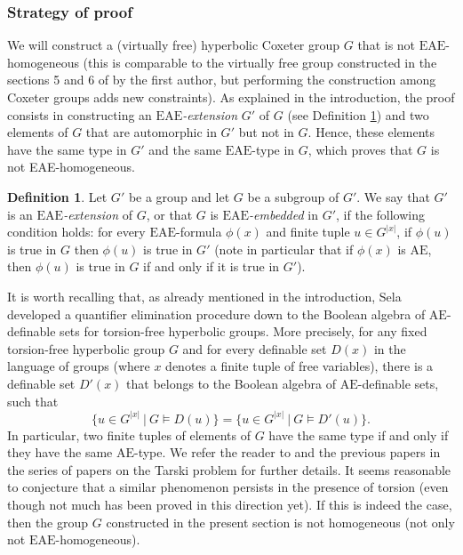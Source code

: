 \documentclass[a4paper, 11pt]{amsart}
\theoremstyle{definition}
\newtheorem{de}[te]{Definition}
\theoremstyle{remark}
\begin{document}
\subsubsection{Strategy of proof}

We will construct a (virtually free) hyperbolic Coxeter group $G$ that is not $\mathrm{EAE}$-homogeneous (this is comparable to the virtually free group constructed in the sections 5 and 6 of \cite{And18b} by the first author, but performing the construction among Coxeter groups adds new constraints). As explained in the introduction, the proof consists in constructing an \emph{$\mathrm{EAE}$-extension} $G'$ of $G$ (see Definition \ref{EAE_def}) and two elements of $G$ that are automorphic in $G'$ but not in $G$. Hence, these elements have the same type in $G'$ and the same $\mathrm{EAE}$-type in $G$, which proves that $G$ is not EAE-homogeneous.

\begin{de}\label{EAE_def}
Let $G'$ be a group and let $G$ be a subgroup of $G'$. We say that $G'$ is an \emph{$\mathrm{EAE}$-extension} of $G$, or that $G$ is \emph{$\mathrm{EAE}$-embedded} in $G'$, if the following condition holds: for every $\mathrm{EAE}$-formula $\phi(x)$ and finite tuple $u\in G^{\vert x\vert}$, if $\phi(u)$ is true in $G$ then $\phi(u)$ is true in $G'$ (note in particular that if $\phi(x)$ is $\mathrm{AE}$, then $\phi(u)$ is true in $G$ if and only if it is true in $G'$).\end{de}

It is worth recalling that, as already mentioned in the introduction, Sela developed a quantifier elimination procedure down to the Boolean algebra of $\mathrm{AE}$-definable sets for torsion-free hyperbolic groups. More precisely, for any fixed torsion-free hyperbolic group $G$ and for every definable set $D(x)$ in the language of groups (where $x$ denotes a finite tuple of free variables), there is a definable set $D'(x)$ that belongs to the Boolean algebra of $\mathrm{AE}$-definable sets, such that \[\lbrace u\in G^{\vert x\vert} \ \vert \ G\models D(u)\rbrace=\lbrace u\in G^{\vert x\vert} \ \vert \ G\models D'(u)\rbrace.\]
In particular, two finite tuples of elements of $G$ have the same type if and only if they have the same $\mathrm{AE}$-type. We refer the reader to \cite{Sel09} and the previous papers in the series of papers on the Tarski problem for further details. It seems reasonable to conjecture that a similar phenomenon persists in the presence of torsion (even though not much has been proved in this direction yet). If this is indeed the case, then the group $G$ constructed in the present section is not homogeneous (not only not $\mathrm{EAE}$-homogeneous).
\end{document}
